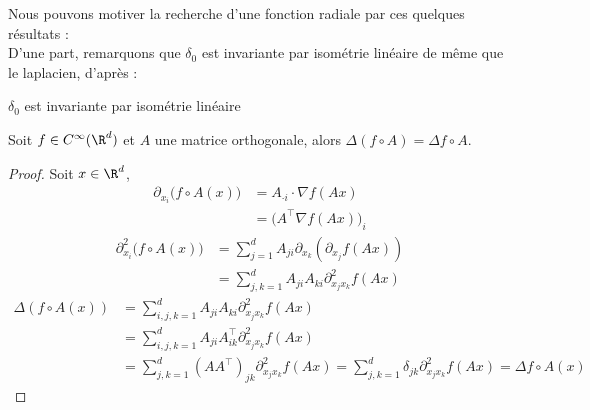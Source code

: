 Nous pouvons motiver la recherche d'une fonction radiale par ces quelques résultats :\\ 
D'une part, remarquons que $\delta_0$ est invariante par isométrie linéaire de même que le laplacien, d'après \cite{Golse} :
\begin{lemmabox}
    \begin{lemma}
        $\delta_0$ est invariante par isométrie linéaire
    \end{lemma}
\end{lemmabox}
\begin{lemmabox}
    \begin{lemma}
        Soit $f \in C^{\infty}(\R^d)$ et $A$ une matrice orthogonale, alors $\Delta (f\circ A) = \Delta f \circ A$.
    \end{lemma}
\end{lemmabox}
\begin{proof}
    Soit $x \in \R^d$,
    \begin{align*}
        \partial_{x_i}\big(f \circ A(x)\big) &= A_{\cdot i} \cdot \nabla f(Ax) \\
        &= \big( A^{\top} \nabla f (Ax) \big)_i 
    \end{align*}
    \begin{align*}
        \partial_{x_i}^2 \big( f \circ A(x) \big) &= \sum_{j = 1}^{d} A_{ji} \partial_{x_k}(\partial_{x_j}f(Ax)) \\
        &= \sum_{j,k = 1}^{d} A_{ji}A_{ki} \partial_{x_j x_k}^2 f(A x)
    \end{align*}
    \begin{align*}
        \Delta (f \circ A(x)) &= \sum_{i,j,k = 1}^d A_{ji}A_{ki} \partial_{x_j x_k}^2 f(A x) \\
        &= \sum_{i,j,k = 1}^d A_{ji}A_{ik}^{\top} \partial_{x_j x_k}^2 f(Ax) \\
        &= \sum_{j,k = 1}^d (A A^{\top})_{jk} \partial_{x_j x_k}^2 f(Ax) = \sum_{j,k = 1}^d \delta_{jk} \partial_{x_j x_k}^2 f(Ax) = \Delta f \circ A(x)
    \end{align*}    
\end{proof}

